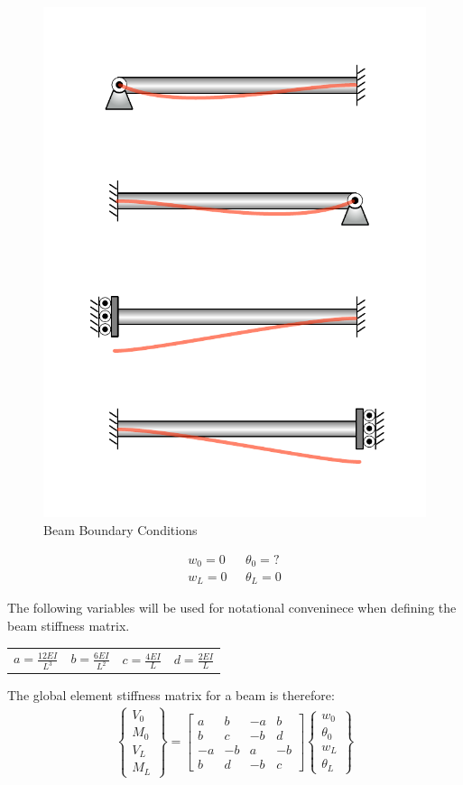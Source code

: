 \begin{figure}[H]	\centerline{\includegraphics[width=0.8\columnwidth]{Figures/BCFrame}}
	\caption{Beam Boundary Conditions}
	\label{fig:BCFrame}
\end{figure}

\begin{align*}
	w_0=0 & \text{	} \theta_0=?\\
	w_L=0 &\text{	}  \theta_L=0
\end{align*}

The following variables will be used for notational conveninece when defining the beam stiffness matrix.

\begin{center}
	\begin{tabular}{cccc}
		$a=\frac{12EI}{L^3}$ & $b=\frac{6EI}{L^2}$ & $c=\frac{4EI}{L}$ & $d=\frac{2EI}{L}$
	\end{tabular}
\end{center}

The global element stiffness matrix for a beam is therefore:
\begin{align}
	\begin{Bmatrix}
		V_0\\ M_0\\ \hline V_L\\ M_L
	\end{Bmatrix}
	=
	\left[
	\begin{array}{cc|cc}
		a & b & -a & b\\
		b & c & -b & d\\ \hline
		-a & -b & a & -b\\
		b & d & -b & c
	\end{array}
	\right]
	\begin{Bmatrix}
		w_0\\ \theta_0\\ \hline w_L\\ \theta_L
	\end{Bmatrix}
\end{align}

